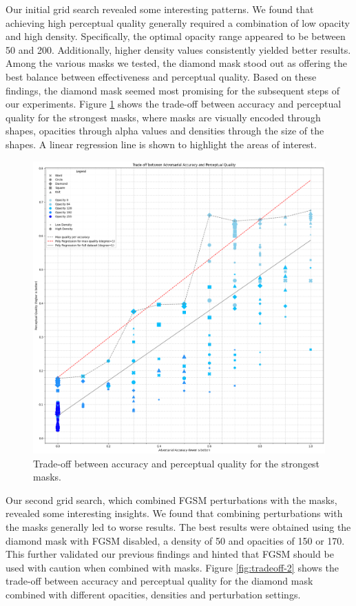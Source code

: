 \documentclass[a4paper, oneside]{discothesis}
\begin{document}
Our initial grid search revealed some interesting patterns. We found that achieving high perceptual quality generally required a combination of low opacity and high density. Specifically, the optimal opacity range appeared to be between 50 and 200. Additionally, higher density values consistently yielded better results. Among the various masks we tested, the diamond mask stood out as offering the best balance between effectiveness and perceptual quality. Based on these findings, the diamond mask seemed most promising for the subsequent steps of our experiments. Figure \ref{fig:tradeoff-1} shows the trade-off between accuracy and perceptual quality for the strongest masks, where masks are visually encoded through shapes, opacities through alpha values and densities through the size of the shapes. A linear regression line is shown to highlight the areas of interest.

\begin{figure}
	\centering
	\includegraphics[width=1\columnwidth]{figures/tradeoff-1.png}
	\caption{Trade-off between accuracy and perceptual quality for the strongest masks.}
	\label{fig:tradeoff-1}
\end{figure}

Our second grid search, which combined FGSM perturbations with the masks, revealed some interesting insights. We found that combining perturbations with the masks generally led to worse results. The best results were obtained using the diamond mask with FGSM disabled, a density of 50 and opacities of 150 or 170. This further validated our previous findings and hinted that FGSM should be used with caution when combined with masks. Figure \ref{fig:tradeoff-2} shows the trade-off between accuracy and perceptual quality for the diamond mask combined with different opacities, densities and perturbation settings.
\end{document}
